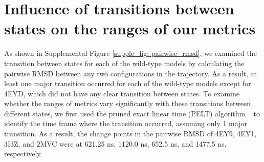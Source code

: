 \documentclass[sn-vancouver]{sn-jnl}
\begin{document}
\section{Influence of transitions between states on the ranges of our metrics}
As shown in Supplemental Figure \ref{supple_fig: pairwise_rmsd}, we examined the transition between states for each of the wild-type models by calculating the pairwise RMSD between any two configurations in the trajectory. As a result, at least one major transition occurred for each of the wild-type models except for 4EYD, which did not have any clear transition between states. To examine whether the ranges of metrics vary significantly with these transitions between different states, we first used the pruned exact linear time (PELT) algorithm ~\cite{killick2012optimal} to identify the time frame where the transition occurred, assuming only 1 major transition. As a result, the change points in the pairwise RMSD of 4EY9, 4EY1, 3I3Z, and 2MVC were at 621.25 ns, 1120.0 ns, 652.5 ns, and 1477.5 ns, respectively. 
\end{document}
